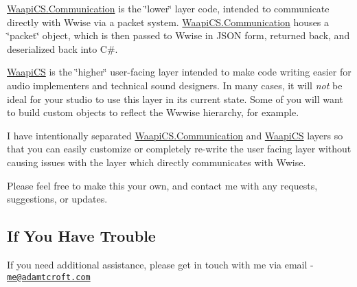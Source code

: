 \mbox{\hyperlink{namespace_waapi_c_s_1_1_communication}{Waapi\+C\+S.\+Communication}} is the \char`\"{}lower\char`\"{} layer code, intended to communicate directly with Wwise via a packet system. \mbox{\hyperlink{namespace_waapi_c_s_1_1_communication}{Waapi\+C\+S.\+Communication}} houses a \char`\"{}packet\char`\"{} object, which is then passed to Wwise in J\+S\+ON form, returned back, and deserialized back into C\#.

\mbox{\hyperlink{namespace_waapi_c_s}{Waapi\+CS}} is the \char`\"{}higher\char`\"{} user-\/facing layer intended to make code writing easier for audio implementers and technical sound designers. In many cases, it will {\itshape not} be ideal for your studio to use this layer in its current state. Some of you will want to build custom objects to reflect the Wwwise hierarchy, for example.

I have intentionally separated \mbox{\hyperlink{namespace_waapi_c_s_1_1_communication}{Waapi\+C\+S.\+Communication}} and \mbox{\hyperlink{namespace_waapi_c_s}{Waapi\+CS}} layers so that you can easily customize or completely re-\/write the user facing layer without causing issues with the layer which directly communicates with Wwise.

Please feel free to make this your own, and contact me with any requests, suggestions, or updates.

\subsection*{If You Have Trouble}

If you need additional assistance, please get in touch with me via email -\/ \href{mailto:me@adamtcroft.com}{\tt me@adamtcroft.\+com} 